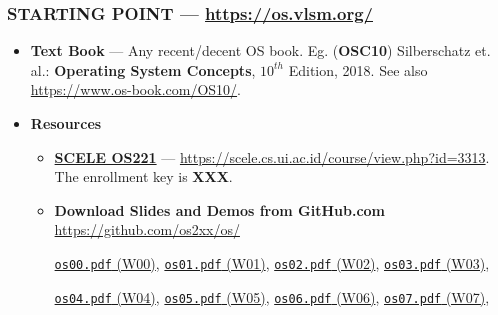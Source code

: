 \begin{frame}[fragile]
\frametitle{\textbf{STARTING POINT} --- 
{
\hypersetup{colorlinks,linkcolor=,urlcolor=links}
\url{https://os.vlsm.org/}
}
}
\begin{itemize}
\item[$\square$] \textbf{Text Book} ---
                 Any recent/decent OS book. Eg. (\textbf{OSC10}) Silberschatz et. al.: 
                 \textbf{Operating System Concepts}, $10^{th}$ Edition, 2018.
                 See also \url{https://www.os-book.com/OS10/}.
\item[$\square$] \textbf{Resources}
\begin{itemize}
\item[$\square$] \href{https://scele.cs.ui.ac.id/course/view.php?id=3313}{\textbf{SCELE OS221}} ---
\url{https://scele.cs.ui.ac.id/course/view.php?id=3313}.\\
The enrollment key is \textbf{XXX}.
\item[$\square$] \textbf{Download Slides and Demos from GitHub.com} \\
\url{https://github.com/os2xx/os/}

                 {\scriptsize%
                 \href{https://os.vlsm.org/Slides/os00.pdf}{\texttt{os00.pdf} (W00)},
                 \href{https://os.vlsm.org/Slides/os01.pdf}{\texttt{os01.pdf} (W01)},
                 \href{https://os.vlsm.org/Slides/os02.pdf}{\texttt{os02.pdf} (W02)},
                 \href{https://os.vlsm.org/Slides/os03.pdf}{\texttt{os03.pdf} (W03)},

                 \href{https://os.vlsm.org/Slides/os04.pdf}{\texttt{os04.pdf} (W04)},
                 \href{https://os.vlsm.org/Slides/os05.pdf}{\texttt{os05.pdf} (W05)},
                 \href{https://os.vlsm.org/Slides/os06.pdf}{\texttt{os06.pdf} (W06)},
                 \href{https://os.vlsm.org/Slides/os07.pdf}{\texttt{os07.pdf} (W07)},

}
\end{itemize}
\end{itemize}
\end{frame}
